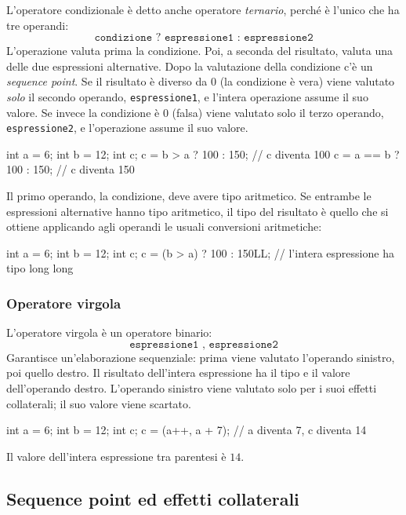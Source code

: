 \documentclass[11pt,a4paper]{article}
\begin{document}
L'operatore condizionale è detto anche operatore \emph{ternario}, perché è l'unico che ha tre operandi:
\[
\texttt{condizione ? espressione1 : espressione2}
\]
L'operazione valuta prima la condizione. Poi, a seconda del risultato, valuta una delle due espressioni alternative. Dopo la valutazione della condizione c'è un \emph{sequence point}. Se il risultato è diverso da $0$ (la condizione è vera) viene valutato \emph{solo} il secondo operando, \texttt{espressione1}, e l'intera operazione assume il suo valore. Se invece la condizione è $0$ (falsa) viene valutato solo il terzo operando, \texttt{espressione2}, e l'operazione assume il suo valore.

\begin{esempio}
\begin{codice}
int a = 6;
int b = 12;
int c;
c = b > a ? 100 : 150;     // c diventa 100
c = a == b ? 100 : 150;    // c diventa 150
\end{codice}
\end{esempio}

Il primo operando, la condizione, deve avere tipo aritmetico. Se entrambe le espressioni alternative hanno tipo aritmetico, il tipo del risultato è quello che si ottiene applicando agli operandi le usuali conversioni aritmetiche:
\begin{codice}
int a = 6;
int b = 12;
int c;
c = (b > a) ? 100 : 150LL;   // l'intera espressione ha tipo long long
\end{codice}

\subsubsection{Operatore virgola}

L'operatore virgola è un operatore binario:
\[
\texttt{espressione1 , espressione2}
\]
Garantisce un'elaborazione sequenziale: prima viene valutato l'operando sinistro, poi quello destro. Il risultato dell'intera espressione ha il tipo e il valore dell'operando destro. L'operando sinistro viene valutato solo per i suoi effetti collaterali; il suo valore viene scartato.

\begin{esempio}
\begin{codice}
int a = 6;
int b = 12;
int c;
c = (a++, a + 7);   // a diventa 7, c diventa 14
\end{codice}
Il valore dell'intera espressione tra parentesi è $14$.
\end{esempio}

\subsection{Sequence point ed effetti collaterali}
\end{document}
